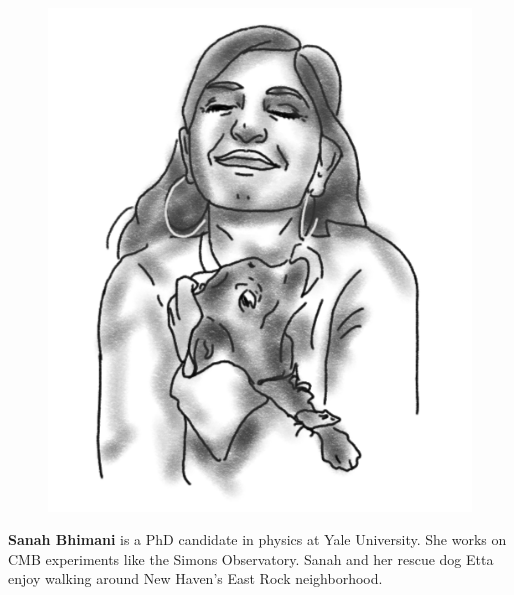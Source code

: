 \begin{figure}
\vspace{-2.5\intextsep}
\includegraphics[width=0.9\linewidth]{portraits/sanah.png}
\end{figure}
\textbf{Sanah Bhimani} is a PhD candidate in physics at Yale University. She works on CMB experiments like the Simons Observatory. Sanah and her rescue dog Etta enjoy walking around New Haven's East Rock neighborhood.\\
\\

